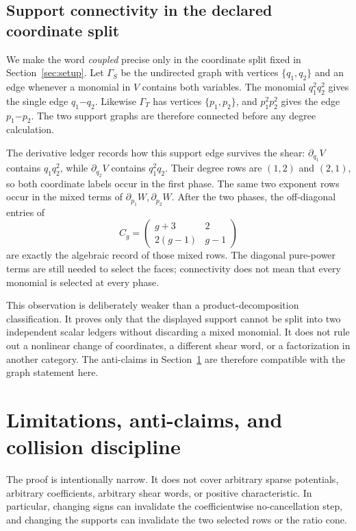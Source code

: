 \documentclass[11pt]{article}
\theoremstyle{remark}
\numberwithin{equation}{section}
\begin{document}
\subsection{Support connectivity in the declared coordinate split}
\label{sec:support-connectivity}

We make the word \emph{coupled} precise only in the coordinate split fixed in
Section~\ref{sec:setup}.  Let \(\Gamma_S\) be the undirected graph with
vertices \(\{q_1,q_2\}\) and an edge whenever a monomial in \(V\) contains
both variables.  The monomial \(q_1^2q_2^2\) gives the single edge
\(q_1\mathord{-}q_2\).  Likewise \(\Gamma_T\) has vertices
\(\{p_1,p_2\}\), and \(p_1^2p_2^2\) gives the edge
\(p_1\mathord{-}p_2\).  The two support graphs are therefore connected before
any degree calculation.

The derivative ledger records how this support edge survives the shear:
\(\partial_{q_1}V\) contains \(q_1q_2^2\), while
\(\partial_{q_2}V\) contains \(q_1^2q_2\).  Their degree rows are
\((1,2)\) and \((2,1)\), so both coordinate labels occur in the first phase.
The same two exponent rows occur in the mixed terms of
\(\partial_{p_1}W,\partial_{p_2}W\).  After the two phases, the off-diagonal
entries of
\[
 C_g=\begin{pmatrix}g+3&2\\2(g-1)&g-1\end{pmatrix}
\]
are exactly the algebraic record of those mixed rows.  The diagonal pure-power
terms are still needed to select the faces; connectivity does not mean that
every monomial is selected at every phase.

This observation is deliberately weaker than a product-decomposition
classification.  It proves only that the displayed support cannot be split
into two independent scalar ledgers without discarding a mixed monomial.
It does not rule out a nonlinear change of coordinates, a different shear
word, or a factorization in another category.  The anti-claims in
Section~\ref{sec:limits} are therefore compatible with the graph statement
here.

\section{Limitations, anti-claims, and collision discipline}\label{sec:limits}

The proof is intentionally narrow.  It does not cover arbitrary sparse
potentials, arbitrary coefficients, arbitrary shear words, or positive
characteristic.  In particular, changing signs can invalidate the
coefficientwise no-cancellation step, and changing the supports can invalidate
the two selected rows or the ratio cone.
\end{document}
